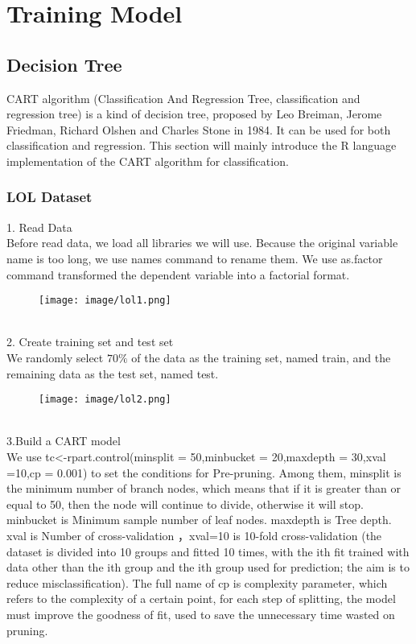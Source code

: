 \documentclass[a4paper,fleqn]{cas-sc}
\begin{document}
\section{Training Model}
\subsection{Decision Tree}
CART algorithm (Classification And Regression Tree, classification and regression tree) is a kind of decision tree, proposed by Leo Breiman, Jerome Friedman, Richard Olshen and Charles Stone in 1984. It can be used for both classification and regression. This section will mainly introduce the R language implementation of the CART algorithm for classification.\\
\subsubsection{LOL Dataset}
1. Read Data\\
Before read data, we load all libraries we will use. Because the original variable name is too long, we use names command to rename them. We use as.factor command transformed the dependent variable into a factorial format.\\
\begin{figure}[h!]
	\centering
		\texttt{[image: image/lol1.png]}
	\caption{}
	\label{FIG:1}
\end{figure}\\
2. Create training set and test set\\
We randomly select $70 \%$ of the data as the training set, named train, and the remaining data as the test set, named test.\\
\begin{figure}[h!]
	\centering
		\texttt{[image: image/lol2.png]}
	\caption{}
	\label{FIG:1}
\end{figure}\\
3.Build a CART model\\
We use tc<-rpart.control(minsplit = 50,minbucket = 20,maxdepth = 30,xval =10,cp = 0.001) to set the conditions for Pre-pruning. Among them, 
minsplit is the minimum number of branch nodes, which means that if it is greater than or equal to 50, then the node will continue to divide, otherwise it will stop. minbucket is Minimum sample number of leaf nodes. maxdepth is Tree depth. xval is Number of cross-validation ，xval=10 is 10-fold cross-validation (the dataset is divided into 10 groups and fitted 10 times, with the ith fit trained with data other than the ith group and the ith group used for prediction; the aim is to reduce misclassification). The full name of cp is complexity parameter, which refers to the complexity of a certain point, for each step of splitting, the model must improve the goodness of fit, used to save the unnecessary time wasted on pruning.\\
\end{document}
